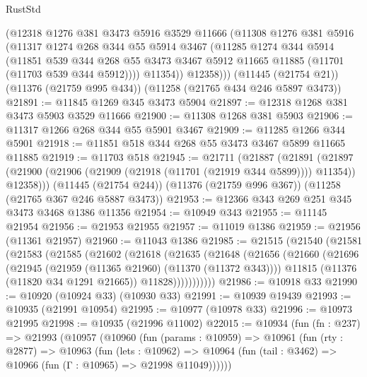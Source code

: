 \begin{lexlean}{RustStd}
\begin{coremodule}
{\begin{coremodule}
{{{{{{{{{{{{{{{{{{{{{{{{{{{{{{{{{{{{{{{{{{{{{{{{{{{{{{{{{{{{{{{{{{{{{{{{{{{{{{{{{{{{{        (@12318
          @1276
          @381
          @3473
          @5916
          @3529
          @11666
          (@11308
            @1276
            @381
            @5916
            (@11317
              @1274
              @268
              @344
              @55
              @5914
              @3467
              (@11285
                @1274
                @344
                @5914
                (@11851
                  @539
                  @344
                  @268
                  @55
                  @3473
                  @3467
                  @5912
                  @11665
                  @11885
                  (@11701 (@11703 @539 @344 @5912))))
              @11354))
          @12358)))
    (@11445 (@21754 @21))
    (@11376 (@21759 @995 @434))
    (@11258 (@21765 @434 @246 @5897 @3473))
@21891 := @11845 @1269 @345 @3473 @5904
@21897 := @12318 @1268 @381 @3473 @5903 @3529 @11666
@21900 := @11308 @1268 @381 @5903
@21906 := @11317 @1266 @268 @344 @55 @5901 @3467
@21909 := @11285 @1266 @344 @5901
@21918 := @11851 @518 @344 @268 @55 @3473 @3467 @5899 @11665 @11885
@21919 := @11703 @518
@21945 := @21711
    (@21887
      (@21891
        (@21897 (@21900 (@21906 (@21909 (@21918 (@11701 (@21919 @344 @5899)))) @11354)) @12358)))
    (@11445 (@21754 @244))
    (@11376 (@21759 @996 @367))
    (@11258 (@21765 @367 @246 @5887 @3473))
@21953 := @12366 @343 @269 @251 @345 @3473 @3468 @1386 @11356
@21954 := @10949 @343
@21955 := @11145 @21954
@21956 := @21953 @21955
@21957 := @11019 @1386
@21959 := @21956 (@11361 @21957)
@21960 := @11043 @1386
@21985 := @21515
    (@21540
      (@21581
        (@21583
          (@21585
            (@21602
              (@21618
                (@21635
                  (@21648
                    (@21656
                      (@21660
                        (@21696
                          (@21945 (@21959 (@11365 @21960) (@11370 (@11372 @343))))
                          @11815
                          (@11376 (@11820 @34 @1291 @21665))
                          @11828)))))))))))
@21986 := @10918 @33
@21990 := @10920 (@10924 @33) (@10930 @33)
@21991 := @10939 @19439
@21993 := @10935 (@21991 @10954)
@21995 := @10977 (@10978 @33)
@21996 := @10973 @21995
@21998 := @10935 (@21996 @11002)
@22015 := @10934
    (fun (fn : @237) =>
    @21993
      (@10957
        (@10960
          (fun (params : @10959) =>
          @10961
            (fun (rty : @2877) =>
            @10963
              (fun (lets : @10962) =>
              @10964 (fun (tail : @3462) => @10966 (fun (Γ : @10965) => @21998 @11049))))))
}}}}}}}}}}}}}}}}}}}}}}}}}}}}}}}}}}}}}}}}}}}}}}}}}}}}}}}}}}}}}}}}}}}}}}}}}}}}}}}}}}}}}
\end{coremodule}}
\end{coremodule}
\end{lexlean}
